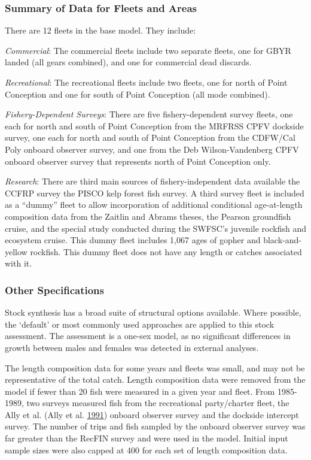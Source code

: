 \documentclass[12pt,]{article}
\begin{document}
\subsubsection{Summary of Data for Fleets and
Areas}\label{summary-of-data-for-fleets-and-areas}

There are 12 fleets in the base model. They include:

\emph{Commercial}: The commercial fleets include two separate fleets,
one for GBYR landed (all gears combined), and one for commercial dead
discards.

\emph{Recreational}: The recreational fleets include two fleets, one for
north of Point Conception and one for south of Point Conception (all
mode combined).

\emph{Fishery-Dependent Surveys}: There are five fishery-dependent
survey fleets, one each for north and south of Point Conception from the
MRFRSS CPFV dockside survey, one each for north and south of Point
Conception from the CDFW/Cal Poly onboard observer survey, and one from
the Deb Wilson-Vandenberg CPFV onboard observer survey that represents
north of Point Conception only.

\emph{Research}: There are third main sources of fishery-independent
data available the CCFRP survey the PISCO kelp forest fish survey. A
third survey fleet is included as a ``dummy'' fleet to allow
incorporation of additional conditional age-at-length composition data
from the Zaitlin and Abrams theses, the Pearson groundfish cruise, and
the special study conducted during the SWFSC's juvenile rockfish and
ecosystem cruise. This dummy fleet includes 1,067 ages of gopher and
black-and-yellow rockfish. This dummy fleet does not have any length or
catches associated with it.

\subsubsection{Other Specifications}\label{other-specifications}

Stock synthesis has a broad suite of structural options available. Where
possible, the `default' or most commonly used approaches are applied to
this stock assessment. The assessment is a one-sex model, as no
significant differences in growth between males and females was detected
in external analyses.

The length composition data for some years and fleets was small, and may
not be representative of the total catch. Length composition data were
removed from the model if fewer than 20 fish were measured in a given
year and fleet. From 1985-1989, two surveys measured fish from the
recreational party/charter fleet, the Ally et al. (Ally et al.
\protect\hyperlink{ref-Ally1991}{1991}) onboard observer survey and the
dockside intercept survey. The number of trips and fish sampled by the
onboard observer survey was far greater than the RecFIN survey and were
used in the model. Initial input sample sizes were also capped at 400
for each set of length composition data.
\end{document}
